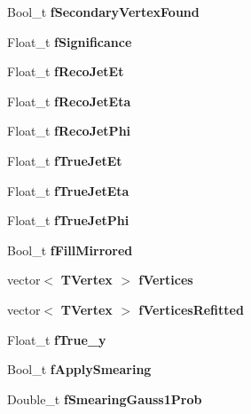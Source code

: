 \begin{CompactItemize}
\item 
Bool\_\-t \textbf{f\-Secondary\-Vertex\-Found}\label{classTMiniNtupleAnalyzer_46ae045134fe9b4cbe4514ddd10e6b66}

\item 
Float\_\-t \textbf{f\-Significance}\label{classTMiniNtupleAnalyzer_cf32c85386178f9363dd0a751f9c466c}

\item 
Float\_\-t \textbf{f\-Reco\-Jet\-Et}\label{classTMiniNtupleAnalyzer_054406aad66adb1ce8d1d5f3b2227320}

\item 
Float\_\-t \textbf{f\-Reco\-Jet\-Eta}\label{classTMiniNtupleAnalyzer_6d0d4038506ecb42d284b8494a62eea0}

\item 
Float\_\-t \textbf{f\-Reco\-Jet\-Phi}\label{classTMiniNtupleAnalyzer_6fff0c7817b2a718c949d0480492f379}

\item 
Float\_\-t \textbf{f\-True\-Jet\-Et}\label{classTMiniNtupleAnalyzer_9aa6463690353e13395ba2711a4f38cc}

\item 
Float\_\-t \textbf{f\-True\-Jet\-Eta}\label{classTMiniNtupleAnalyzer_920e554d9b1dc193b535b0f19a9445b3}

\item 
Float\_\-t \textbf{f\-True\-Jet\-Phi}\label{classTMiniNtupleAnalyzer_1520727f726cd765e73256caaeffe91d}

\item 
Bool\_\-t \textbf{f\-Fill\-Mirrored}\label{classTMiniNtupleAnalyzer_6b52adfde82d38de9743201443b74652}

\item 
vector$<$ \bf{TVertex} $>$ \textbf{f\-Vertices}\label{classTMiniNtupleAnalyzer_88081b1374178f61a78f859ac28e181d}

\item 
vector$<$ \bf{TVertex} $>$ \textbf{f\-Vertices\-Refitted}\label{classTMiniNtupleAnalyzer_fd83d2a460c9b26e048231631f8bfcaf}

\item 
Float\_\-t \textbf{f\-True\_\-y}\label{classTMiniNtupleAnalyzer_7fd18e588f63ac92979f031cf7d4531f}

\item 
Bool\_\-t \textbf{f\-Apply\-Smearing}\label{classTMiniNtupleAnalyzer_9e941561cceb58648b37655a43643a1f}

\item 
Double\_\-t \textbf{f\-Smearing\-Gauss1Prob}\label{classTMiniNtupleAnalyzer_c2f43f09648864a5b51155e963d39ab8}


\end{CompactItemize}
